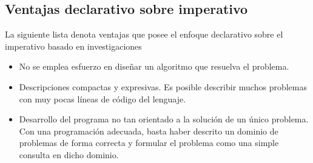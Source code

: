\subsection{Ventajas declarativo sobre imperativo}
La siguiente lista denota ventajas que posee el enfoque declarativo sobre el imperativo basado en investigaciones \cite{Dec10}
\begin{itemize}
\item No se emplea esfuerzo en diseñar un algoritmo que resuelva el problema.
\item Descripciones compactas y expresivas. Es posible describir muchos problemas con muy pocas líneas de código del lenguaje.
\item Desarrollo del programa no tan orientado a la solución de un único problema. Con una programación adecuada, basta haber descrito un dominio de problemas de forma correcta y formular el problema como una simple consulta en dicho dominio.
\end{itemize}